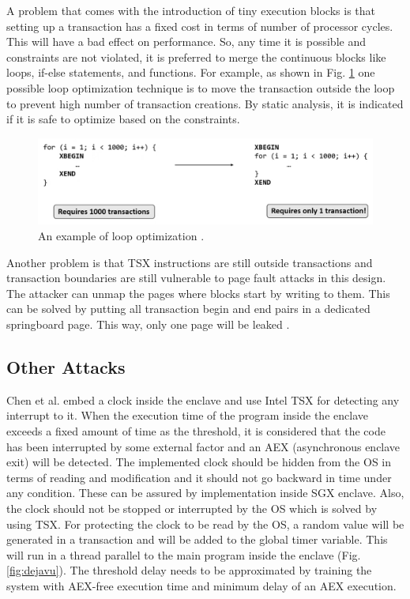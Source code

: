 A problem that comes with the introduction of tiny execution blocks is that setting up a transaction has a fixed cost in terms of number of processor cycles. This will have a bad effect on performance. So, any time it is possible and constraints are not violated, it is preferred to merge the continuous blocks like loops, if-else statements, and functions. For example, as shown in Fig. \ref{fig:tsgxloop} one possible loop optimization technique is to move the transaction outside the loop to prevent high number of transaction creations. By static analysis, it is indicated if it is safe to optimize based on the constraints.

\begin{figure}
	\includegraphics[scale=0.2]{images/tsgxloop}
	\caption{An example of loop optimization \cite{heisenberg}.}
	\label{fig:tsgxloop}
\end{figure}

Another problem is that TSX instructions are still outside transactions and transaction boundaries are still vulnerable to page fault attacks in this design. The attacker can unmap the pages where blocks start by writing to them. This can be solved by putting all transaction begin and end pairs in a dedicated springboard page. This way, only one page will be leaked \cite{tsgx}.

\subsection{Other Attacks}
Chen et al. \cite{dejavu} embed a clock inside the enclave and use Intel TSX for detecting any interrupt to it. When the execution time of the program inside the enclave exceeds a fixed amount of time as the threshold, it is considered that the code has been interrupted by some external factor and an AEX (asynchronous enclave exit) will be detected. The implemented clock should be hidden from the OS in terms of reading and modification and it should not go backward in time under any condition. These can be assured by implementation inside SGX enclave. Also, the clock should not be stopped or interrupted by the OS which is solved by using TSX. For protecting the clock to be read by the OS, a random value will be generated in a transaction and will be added to the global timer variable. This will run in a thread parallel to the main program inside the enclave (Fig. \ref{fig:dejavu}). The threshold delay needs to be approximated by training the system with AEX-free execution time and minimum delay of an AEX execution.

